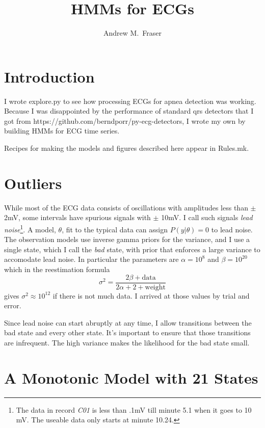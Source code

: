 \documentclass[12pt]{article}
\title{HMMs for ECGs}
\author{Andrew M.\ Fraser}
\begin{document}
\maketitle

\section{Introduction}
\label{sec:introduction}

I wrote explore.py to see how processing ECGs for apnea detection was
working.  Because I was disappointed by the performance of standard qrs
detectors that I got from
https://github.com/berndporr/py-ecg-detectors, I wrote my own by
building HMMs for ECG time series.

Recipes for making the models and figures described here appear in
Rules.mk.

\section{Outliers}
\label{sec:outliers}

While most of the ECG data consists of oscillations with amplitudes
less than $\pm$ 2mV, some intervals have spurious signals with $\pm$
10mV.  I call such signals \emph{lead noise}\footnote{The data in
  record \emph{C01} is less than .1mV till minute 5.1 when it goes to
  10 mV.  The useable data only starts at minute 10.24.}.  A model,
$\theta$, fit to the typical data can assign $P(y|\theta) = 0$ to lead
noise.  The observation models use inverse gamma priors for the
variance, and I use a single state, which I call the \emph{bad} state,
with prior that enforces a large variance to accomodate lead noise.
In particular the parameters are $\alpha=10^{8}$ and $\beta=10^{20}$
which in the reestimation formula
\begin{equation*}
  \sigma^2 = \frac{2 \beta + \text{data}}{2 \alpha +2 + \text{weight}}
\end{equation*}
gives $\sigma^2 \approx 10^{12}$ if there is not much data.  I arrived
at those values by trial and error.

Since lead noise can start abruptly at any time, I allow transitions
between the bad state and every other state.  It's important to ensure
that those transitions are infrequent.  The high variance makes the
likelihood for the bad state small.

\section{A Monotonic Model with 21 States}
\label{sec:mono20}
\end{document}
